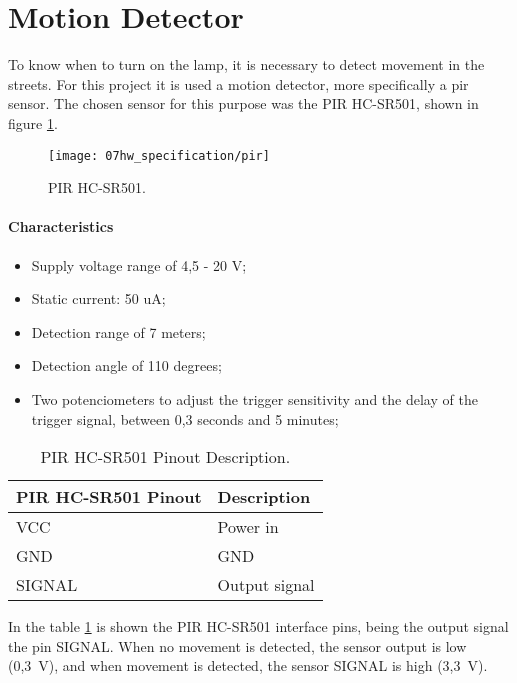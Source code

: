 \section{Motion Detector}
To know when to turn on the lamp, it is necessary to detect movement in the streets. For this project it is used a motion detector, more specifically a \ac{pir} sensor. The chosen sensor for this purpose was the PIR HC-SR501, shown in figure \ref{fig:pir}.  \cite{pir}

\begin{figure}[H]
	\centering
	\texttt{[image: 07hw\_specification/pir]}
	\caption{PIR HC-SR501.}
	\label{fig:pir}
\end{figure}

\paragraph*{Characteristics}
\begin{itemize}
	\item Supply voltage range of 4,5 - 20 V;
	\item Static current: 50 uA;
	\item Detection range of 7 meters;
	\item Detection angle of 110 degrees;
	\item Two potenciometers to adjust the trigger sensitivity and the delay of the trigger signal, between 0,3 seconds and 5 minutes;
\end{itemize}

\begin{table}[H]
	\centering
	\begin{tabular}{|m{5cm}|m{6cm}|}
		\hline
		\textbf{PIR HC-SR501 Pinout} & \textbf{Description}
		\\\hline\hline
		VCC & Power in
		\\\hline
		GND & GND
		\\\hline
		SIGNAL & Output signal
		\\\hline
	\end{tabular}
	
	\caption{PIR HC-SR501 Pinout Description.}
	\label{table:desc_pir}
\end{table}

In the table \ref{table:desc_pir} is shown the PIR HC-SR501 interface pins, being the output signal the pin SIGNAL. When no movement is detected, the sensor output is low (0,3~V), and when movement is detected, the sensor SIGNAL is high (3,3~V). 

